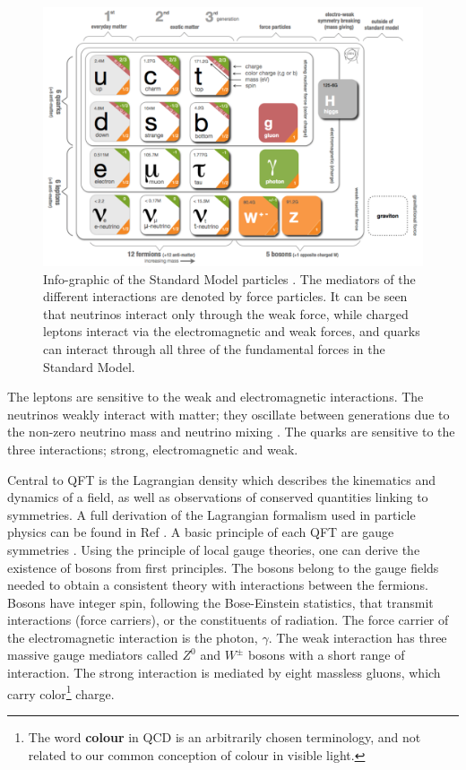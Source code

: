 \begin{figure}[htb!]
\includegraphics[width=\textwidth]{images/2-LHC-ATLAS/SM-infographic.png}
\caption{Info-graphic of the Standard Model particles \cite{david_galbraith_ux_2012}. The mediators of the different interactions are denoted by force particles. It can be seen that neutrinos interact only through the weak force, while charged leptons interact via the electromagnetic and weak forces, and quarks can interact through all three of the fundamental forces in the Standard Model.}
\label{fig: sm-infographic}
\end{figure}

The leptons are sensitive to the weak and electromagnetic interactions. The neutrinos weakly interact with matter; they oscillate between generations due to the non-zero neutrino mass and neutrino mixing \cite{Bilenky_1999}. The quarks are sensitive to the three interactions; strong, electromagnetic and weak. 

Central to QFT is the Lagrangian density which describes the kinematics and dynamics of a field, as well as observations of conserved quantities linking to symmetries. A full derivation of the Lagrangian formalism used in particle physics can be found in Ref \cite{gauge-theories}. A basic principle of each QFT are gauge symmetries \cite{bailin1993introduction}. Using the principle of local gauge theories, one can derive the existence of bosons from first principles. The bosons belong to the gauge fields needed to obtain a consistent theory with interactions between the fermions. Bosons have integer spin, following the Bose-Einstein statistics, that transmit interactions (force carriers), or the constituents of radiation. The force carrier of the electromagnetic interaction is the photon, $\gamma$. The weak interaction has three massive gauge mediators called $Z^{0}$ and $W^{\pm}$ bosons with a short range of interaction. The strong interaction is mediated by eight massless gluons, which carry color\footnote{The word \textbf{colour} in QCD is an arbitrarily chosen terminology, and not related to our common conception of colour in visible light.} charge. 

